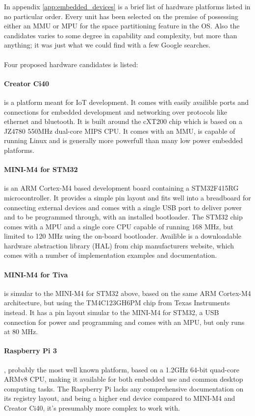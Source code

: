 In appendix \ref{app:embedded_devices} is a brief list of hardware platforms listed in no particular order.
Every unit has been selected on the premise of possessing either an MMU or MPU for the space partitioning feature in the OS.
Also the candidates varies to some degree in capability and complexity,
but more than anything; it was just what we could find with a few Google searches.
\\\\
Four proposed hardware candidates is listed:

\paragraph{Creator Ci40} is a platform meant for IoT development.
It comes with easily availible ports and connections for embedded development
and networking over protocols like ethernet and bluetooth.
It is built around the cXT200 chip which is based on a JZ4780 550MHz dual-core MIPS CPU.
It comes with an MMU, is capable of running Linux
and is generally more powerfull than many low power embedded platforms.

\paragraph{MINI-M4 for STM32} is an ARM Cortex-M4 based development board containing a STM32F415RG microcontroller.
It provides a simple pin layout and fits well into a breadboard for connecting external devices
and comes with a single USB port to deliver power and to be programmed through, with an installed bootloader.
The STM32 chip comes with a MPU and a single core CPU capable of running 168 MHz,
but limited to 120 MHz using the on-board bootloader.
Availible is a downloadable hardware abstraction library (HAL) from chip manufacturers website,
which comes with a number of implementation examples and documentation.

\paragraph{MINI-M4 for Tiva} is simular to the MINI-M4 for STM32 above,
based on the same ARM Cortex-M4 architecture,
but using the TM4C123GH6PM chip from Texas Instruments instead.
It has a pin layout simular to the MINI-M4 for STM32,
a USB connection for power and programming and comes with an MPU,
but only runs at 80 MHz.

\paragraph{Raspberry Pi 3}, probably the most well known platform,
based on a 1.2GHz 64-bit quad-core ARMv8 CPU,
making it available for both embedded use and common desktop computing tasks.
The Raspberry Pi lacks any comprehensive documentation on its registry layout,
and being a higher end device compared to MINI-M4 and Creator Ci40,
it's presumably more complex to work with.


